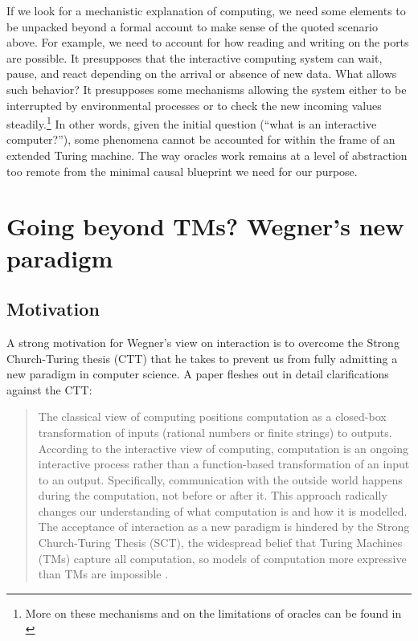 \documentclass[a4paper, 11pt, twoside]{article}
\begin{document}
If we look for a mechanistic explanation of computing, we need some elements to be unpacked beyond a formal account to make sense of the quoted scenario above. For example, we need to account for how reading and writing on the ports are possible. It presupposes that the interactive computing system can wait, pause, and react depending on the arrival or absence of new data. What allows such behavior? It presupposes some mechanisms allowing the system either to be interrupted by environmental processes or to check the new incoming values steadily.\footnote{More on these mechanisms and on the limitations of oracles can be found in \parencite{Martin2023}} 
In other words, given the initial question (``what is an interactive computer?''), some phenomena cannot be accounted for within the frame of an extended Turing machine. The way oracles work remains at a level of abstraction too remote from the minimal causal blueprint we need for our purpose.

\section{Going beyond TMs? Wegner’s new paradigm}
\label{Wegner}

\subsection{Motivation}

A strong motivation for Wegner’s view on interaction is to overcome the Strong Church-Turing thesis (CTT) that he takes to prevent us from fully admitting a new paradigm in computer science. A paper fleshes out in detail clarifications against the CTT: 

\begin{quote}
The classical view of computing positions computation as a closed-box transformation of inputs (rational numbers or finite strings) to outputs. According to the interactive view of computing, computation is an ongoing interactive process rather than a function-based transformation of an input to an output. Specifically, communication with the outside world happens during the computation, not before or after it. This approach radically changes our understanding of what computation is and how it is modelled. The acceptance of interaction as a new paradigm is hindered by the Strong Church-Turing Thesis (SCT), the widespread belief that Turing Machines (TMs) capture all computation, so models of computation more expressive than TMs are impossible \parencite{Goldin2008}.
\end{quote}
\end{document}
